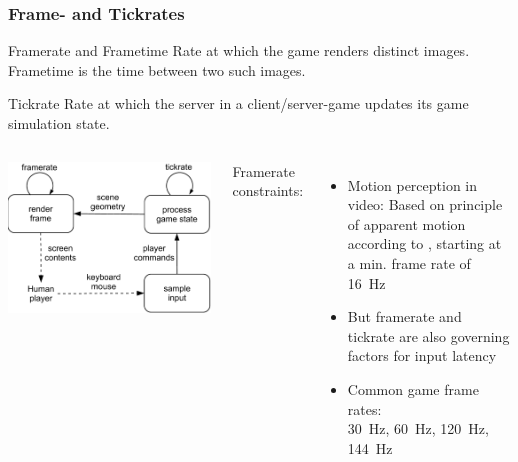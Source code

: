 \documentclass{UDEbeamerEN}
\begin{document}
\begin{frame}
	\frametitle{Frame- and Tickrates}

	\vspace{-2mm}

	\begin{block}{Framerate and Frametime}
		Rate at which the game renders distinct images. Frametime is the time between two such images.
	\end{block}

	\pause
	\begin{block}{Tickrate}
		Rate at which the server in a client/server-game updates its game simulation state.
	\end{block}


	\pause
	\begin{columns}[T]
			\begin{center}
				\includegraphics[width=0.7\columnwidth]{../../../models/game_loop.pdf}
			\end{center}

		\pause
			\vspace{-1mm}
			Framerate constraints:
			\vspace{-1mm}
			\begin{itemize}
				\item Motion perception in video: Based on principle of apparent motion according to \cite{wertheimer1912experimentelle}, starting at a min. frame rate of \SI{16}{\hertz}
				\item But framerate and tickrate are also governing factors for input latency

				\item Common game frame rates:\\ \SI{30}{\hertz}, \SI{60}{\hertz}, \SI{120}{\hertz}, \SI{144}{\hertz}
			\end{itemize}
	\end{columns}

\end{frame}
\end{document}
